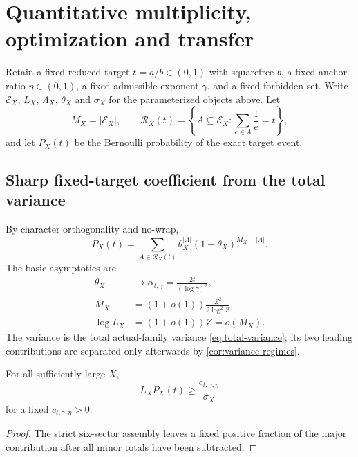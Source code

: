 \section{Quantitative multiplicity, optimization and transfer}
\label{sec:quantitative-multiplicity}

Retain a fixed reduced target $t=a/b\in(0,1)$ with squarefree $b$, a fixed anchor ratio $\eta\in(0,1)$, a fixed admissible exponent $\gamma$, and a fixed forbidden set.  Write $\mathcal E_X$, $L_X$, $\Lambda_X$, $\theta_X$ and $\sigma_X$ for the parameterized objects above.  Let
\[
 M_X=|\mathcal E_X|,
 \qquad
 \mathcal R_X(t)=\left\{A\subseteq\mathcal E_X:
   \sum_{e\in A}\frac1e=t\right\},
\]
and let $P_X(t)$ be the Bernoulli probability of the exact target event.

\subsection{Sharp fixed-target coefficient from the total variance}

By character orthogonality and no-wrap,
\begin{equation}
\label{eq:quantitative-weighted-count}
 P_X(t)=\sum_{A\in\mathcal R_X(t)}
 \theta_X^{|A|}(1-\theta_X)^{M_X-|A|}.
\end{equation}
The basic asymptotics are
\begin{equation}
\label{eq:quantitative-basic-asymptotics}
\begin{aligned}
 \theta_X&\longrightarrow\alpha_{t,\gamma}
 =\frac{2t}{(\log\gamma)^2},\\
 M_X&=(1+o(1))\frac{Z^2}{2\log^2Z},\\
 \log L_X&=(1+o(1))Z=o(M_X).
\end{aligned}
\end{equation}
The variance is the total actual-family variance \cref{eq:total-variance}; its two leading contributions are separated only afterwards by \cref{cor:variance-regimes}.

\begin{corollary}
\label{cor:quantitative-coefficient}
For all sufficiently large $X$,
\begin{equation}
\label{eq:quantitative-coefficient}
 L_XP_X(t)\geq\frac{c_{t,\gamma,\eta}}{\sigma_X}
\end{equation}
for a fixed $c_{t,\gamma,\eta}>0$.
\end{corollary}

\begin{proof}
The strict six-sector assembly leaves a fixed positive fraction of the major contribution after all minor totals have been subtracted.
\end{proof}

